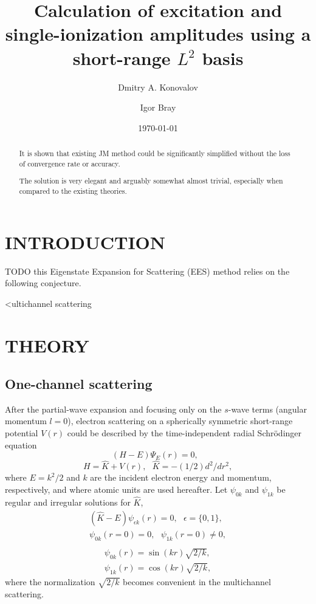 \documentclass[aip
, pra
, showpacs
, aps
, twocolumn
, groupedaddress
, floatfix
]{revtex4}
\newcommand{\beq}{\begin{equation}}
\newcommand{\eeq}{\end{equation}}
\newcommand{\barr}{\begin{array}}
\newcommand{\earr}{\end{array}}
\begin{document}
\title {Calculation of excitation and single-ionization amplitudes using a short-range $L^2$ basis}

\author{Dmitry A. Konovalov}

\author{Igor Bray}


\date{\today}

\begin{abstract}
It is shown that existing JM method could be significantly simplified without the loss of convergence rate or accuracy.


The solution is very elegant and arguably somewhat almost trivial, especially when compared to
the existing theories.

\end{abstract}

\maketitle

\section{INTRODUCTION}
TODO
this Eigenstate Expansion for Scattering (EES) method relies on the following conjecture.

<ultichannel scattering \cite{CA73, NO72, TF79, Nesbet78, Lucchese86}

\section{THEORY}
\subsection{One-channel scattering}


After the partial-wave expansion \cite{Taylor72,N82} and focusing only on the $s$-wave terms (angular momentum $l=0$),
electron scattering on a spherically symmetric short-range potential $V(r)$
could be described by the time-independent radial Schr\"odinger equation
\beq
(H-E) \Psi_E (r) =0,  \ \ \  \label{H_E_Psi_E}
\eeq
\beq
H = \hat{K} + V(r), \ \ \ \hat{K} = -(1/2) d^2/dr^2,
\eeq
where $E=k^2/2$ and $k$ are the incident electron energy and momentum, respectively, and where
atomic units are used hereafter.
Let $\psi_{0k}$ and $\psi_{1k}$ be regular and irregular solutions for $\hat{K}$,
\beq \barr{l}
(\hat{K}-E)  \psi_{\epsilon k} (r) =0, \ \ \ \epsilon=\{0,1\},\\ 
\psi_{0k}(r=0) = 0, \ \ \ \psi_{1k}(r=0) \neq 0,\\
\earr \label{H_0_E_psi}\eeq
\beq \barr{l}
\psi_{0k}(r) = \sin(kr) \sqrt{2/k},\\
\psi_{1k}(r) = \cos(kr) \sqrt{2/k},
\earr \label{K} \eeq
where the normalization $\sqrt{2/k}$ becomes convenient in the multichannel scattering.
\end{document}
